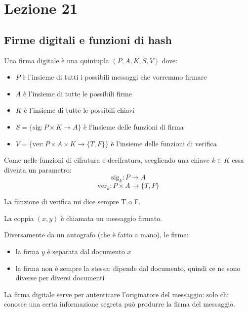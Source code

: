 \section*{Lezione 21}

\subsection*{Firme digitali e funzioni di hash}

Una firma digitale è una quintupla $(P,A,K,S,V)$ dove:
\begin{itemize}
	\item $P$ è l'insieme di tutti i possibili messaggi che vorremmo firmare
	\item $A$ è l'insieme di tutte le possibili firme
	\item $K$ è l'insieme di tutte le possibili chiavi
	\item $S=\{\text{sig}:P\times K \rightarrow A\}$ è l'insieme delle funzioni di firma
	\item $V=\{\text{ver}:P\times A \times K \rightarrow \{T, F\}\}$ è l'insieme delle funzioni di verifica
\end{itemize}

Come nelle funzioni di cifratura e decifratura, scegliendo una chiave $k \in K$ essa diventa un parametro:
\begin{equation*}
	\text{sig}_k:P \rightarrow A
\end{equation*}
\begin{equation*}
	\text{ver}_k:P \times A \rightarrow \{T, F\}
\end{equation*}

La funzione di verifica mi dice sempre T o F.

La coppia $(x,y)$ è chiamata un messaggio firmato.

Diversamente da un autografo (che è fatto a mano), le firme:
\begin{itemize}
	\item la firma $y$ è separata dal documento $x$
	\item la firma non è sempre la stessa: dipende dal documento, quindi ce ne sono diverse per diversi documenti
\end{itemize}

La firma digitale serve per autenticare l'originatore del messaggio: solo chi conosce una certa informazione segreta può produrre la firma del messaggio.

